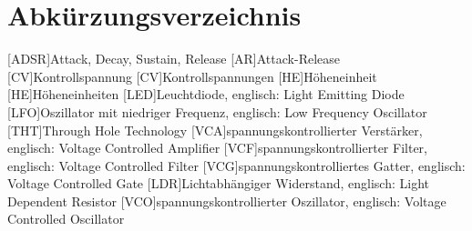 
\chapter*{Abkürzungsverzeichnis}
\begin{acronym}
  [ADSR]{Attack, Decay, Sustain, Release}
  [AR]{Attack-Release}
  [CV]{Kontrollspannung}
  [CV]{Kontrollspannungen}
  [HE]{Höheneinheit}
  [HE]{Höheneinheiten}
  [LED]{Leuchtdiode, englisch: Light Emitting Diode}
  [LFO]{Oszillator mit niedriger Frequenz, englisch: Low Frequency Oscillator}
  [THT]{Through Hole Technology}
  [VCA]{spannungskontrollierter Verstärker, englisch: Voltage Controlled Amplifier}
  [VCF]{spannungskontrollierter Filter, englisch: Voltage Controlled Filter}
  [VCG]{spannungskontrolliertes Gatter, englisch: Voltage Controlled Gate}
  [LDR]{Lichtabhängiger Widerstand, englisch: Light Dependent Resistor}
  [VCO]{spannungskontrollierter Oszillator, englisch: Voltage Controlled Oscillator}
\end{acronym}


